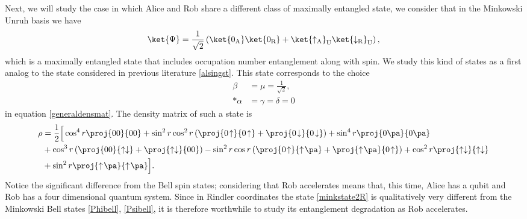 Next, we will study the case in which Alice and Rob share a different class of maximally entangled state, we consider that in the Minkowski Unruh basis we have
\begin{equation}\label{minkstate2}
\ket{\Psi}=\frac{1}{\sqrt2}\left(\ket{0_\text{A}}\ket{0_\text{R}}+\ket{\uparrow_\text{A}}_\text{U}\ket{\downarrow_\text{R}}_\text{U}\right),
\end{equation}
which is a maximally entangled state that includes occupation number entanglement along with spin. We study this kind of states as a first analog to the state considered in previous literature \eqref{alsingst}. This state corresponds to the choice
\begin{align}\label{coef22}
\beta&=\mu=\frac{1}{\sqrt2},\\*
\alpha&=\gamma=\delta=0
\end{align}
in equation \eqref{generaldensmat}. The density matrix of such a state is
\begin{align}\label{minkstate2R}
\nonumber\rho&=\frac12\Big[\cos^4r\proj{00}{00}+\sin^2r\cos^2r\left(\proj{0\!\uparrow}{0\!\uparrow}+\proj{0\!\downarrow}{0\!\downarrow}\right)+\sin^4r\proj{0\pa}{0\pa}\\*
&+\cos^3r\left(\proj{00}{\uparrow\downarrow}+\proj{\uparrow\downarrow}{00}\right)-\sin^2r\cos r\left(\proj{0\!\uparrow}{\uparrow\!\pa}+\proj{\uparrow\!\pa}{0\!\uparrow}\right)+\cos^2r\proj{\uparrow\downarrow}{\uparrow\downarrow}\nonumber\\*
&+\sin^2r\proj{\uparrow\!\pa}{\uparrow\!\pa}\Big].
\end{align}
Notice the significant difference from the Bell spin states; considering that Rob accelerates means that, this time, Alice has a qubit and Rob has a four dimensional quantum system. Since in Rindler coordinates the state \eqref{minkstate2R} is qualitatively very different from the Minkowski Bell states \eqref{Phibell}, \eqref{Psibell}, it is therefore worthwhile to study its entanglement degradation as Rob accelerates.

